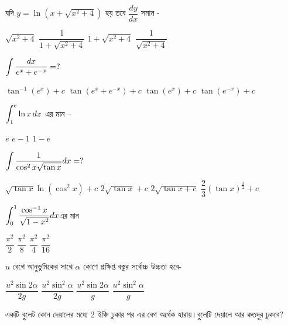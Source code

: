 \documentclass[addpoints]{exam}
\begin{document}
\begin{questions}
\question যদি $ y=\ln (x+\sqrt{x^{2}+4})  $ হয় তবে   $\dfrac{dy}{dx} $ সমান - 

\begin{oneparchoices}
\choice $ \sqrt{x^{2}+4} $
\choice $ \dfrac{1}{1+\sqrt{x^{2}+4}} $
\choice $ 1+\sqrt{x^{2}+4} $
\choice $ \dfrac{1}{\sqrt{x^{2}+4}} $
\end{oneparchoices}

\question $ \mathlarger{\int \dfrac{dx}{e^{x}+e^{-x}}=?} $

\begin{oneparchoices}
\choice $ \tan^{-1} (e^{x}) +c $
\choice $ \tan (e^{x}+e^{-x}) +c $
\choice $ \tan (e^{x}) +c $
\choice $ \tan (e^{-x}) +c$
\end{oneparchoices}

\question  $ \mathlarger{\int_{1}^{e}\ln x\, dx} $ এর  মান – 

\begin{oneparchoices}
\choice  $ e $
\choice  $ e-1 $
\choice  $ 1-e $
\end{oneparchoices}

\question  $ \mathlarger{\int\dfrac{1}{\cos^{2}x\sqrt{\tan x}} dx} =?$  

\begin{oneparchoices}
\choice  $ \sqrt{\tan x}\ln (\cos^{2}x)+c $
\choice  $ 2\sqrt{\tan x} +c $
\choice  $ 2\sqrt{\tan x +c}  $
\choice  $ \dfrac{2}{3}(\tan x)^{\frac{3}{2}} +c $
\end{oneparchoices}

\question  $ \mathlarger{\int_{0}^{1}\dfrac{\cos^{-1}x}{\sqrt{1-x^{2}}}dx} $এর মান

\begin{oneparchoices}
\choice $ \dfrac{\pi^{2}}{2} $
\choice $ \dfrac{\pi^{2}}{8} $
\choice $ \dfrac{\pi^{2}}{4} $
\choice $ \dfrac{\pi^{2}}{16} $

\end{oneparchoices}

\question  $ u $ বেগে আনুভুমিকের সাথে $ \alpha $ কোণে প্রক্ষিপ্ত বস্তুর সর্বোচ্চ উচ্চতা হবে-

\begin{oneparchoices}
\choice $ \dfrac{u^{2}\sin 2\alpha}{2g} $
\choice $ \dfrac{u^{2}\sin^{2}\alpha}{2g} $
\choice $ \dfrac{u^{2}\sin 2\alpha}{g} $
\choice $ \dfrac{u^{2}\sin^{2}\alpha}{g} $

\end{oneparchoices}

\question  একটি বুলেট কোন দেয়ালের মধ্যে 2 ইঞ্চি ঢুকার পর এর বেগ অর্ধেক হারায়।বুলেটি দেয়ালে আর কতদুর ঢুকবে?


\end{questions}
\end{document}
